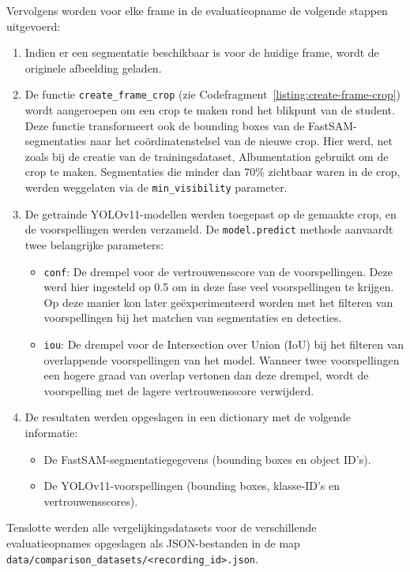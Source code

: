 Vervolgens worden voor elke frame in de evaluatieopname de volgende stappen uitgevoerd:
\begin{enumerate}
    \item Indien er een segmentatie beschikbaar is voor de huidige frame, wordt de originele afbeelding geladen.
    \item De functie \texttt{create\_frame\_crop} (zie Codefragment~\ref{listing:create-frame-crop}) wordt aangeroepen om een crop te maken rond het blikpunt van de student.
    Deze functie transformeert ook de bounding boxes van de FastSAM-segmentaties naar het coördinatenstelsel van de nieuwe crop.
    Hier werd, net zoals bij de creatie van de trainingsdataset, Albumentation gebruikt om de crop te maken.
    Segmentaties die minder dan 70\% zichtbaar waren in de crop, werden weggelaten via de \texttt{min\_visibility} parameter.
    \item De getrainde YOLOv11-modellen werden toegepast op de gemaakte crop, en de voorspellingen werden verzameld.
    De \texttt{model.predict} methode aanvaardt twee belangrijke parameters:
    \begin{itemize}
        \item \texttt{conf}: De drempel voor de vertrouwensscore van de voorspellingen.
        Deze werd hier ingesteld op 0.5 om in deze fase veel voorspellingen te krijgen. 
        Op deze manier kon later geëxperimenteerd worden met het filteren van voorspellingen bij het matchen van segmentaties en detecties.
        \item \texttt{iou}: De drempel voor de Intersection over Union (IoU) bij het filteren van overlappende voorspellingen van het model.
        Wanneer twee voorspellingen een hogere graad van overlap vertonen dan deze drempel, wordt de voorspelling met de lagere vertrouwensscore verwijderd.
    \end{itemize}
    \item De resultaten werden opgeslagen in een dictionary met de volgende informatie:
    \begin{itemize}
        \item De FastSAM-segmentatiegegevens (bounding boxes en object ID's).
        \item De YOLOv11-voorspellingen (bounding boxes, klasse-ID's en vertrouwensscores).
    \end{itemize}
\end{enumerate}
Tenslotte werden alle vergelijkingsdatasets voor de verschillende evaluatieopnames opgeslagen als JSON-bestanden in de map\\
\texttt{data/comparison\_datasets/<recording\_id>.json}.

